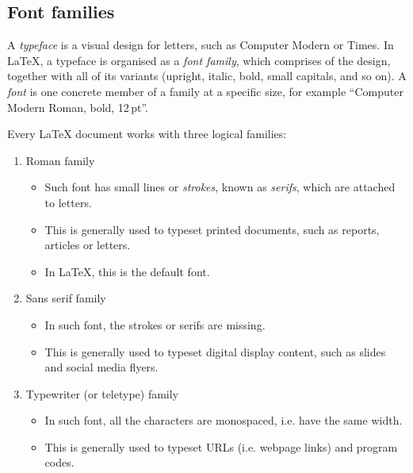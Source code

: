 	\subsection{Font families}
		A \emph{typeface} is a visual design for letters, such as Computer Modern or Times. In \LaTeX, a typeface is organised as a \emph{font family}, which comprises of the design, together with all of its variants (upright, italic, bold, small capitals, and so on). A \emph{font} is one concrete member of a family at a specific size,
		for example ``Computer Modern Roman, bold, 12\,pt''.
		
		Every \LaTeX{} document works with three logical families:
		\begin{enumerate}
			\item Roman family
			\begin{center}
				\Large{}
			\end{center}
			\begin{itemize}
				\item Such font has small lines or \emph{strokes}, known as \emph{serifs}, which are attached to letters.
				\item This is generally used to typeset printed documents, such as reports, articles or letters.
				\item In \LaTeX, this is the default font.
			\end{itemize}
			
			\item Sans serif family
			\begin{center}
				\Large{}
			\end{center}
			\begin{itemize}
				\item In such font, the strokes or serifs are missing.
				\item This is generally used to typeset digital display content, such as slides and social media flyers.
			\end{itemize}
			
			\item Typewriter (or teletype) family
			\begin{center}
				\Large{}
			\end{center}
			\begin{itemize}
				\item In such font, all the characters are monospaced, i.e. have the same width.
				\item This is generally used to typeset URLs (i.e. webpage links) and program codes.
			\end{itemize}
		\end{enumerate}
		
